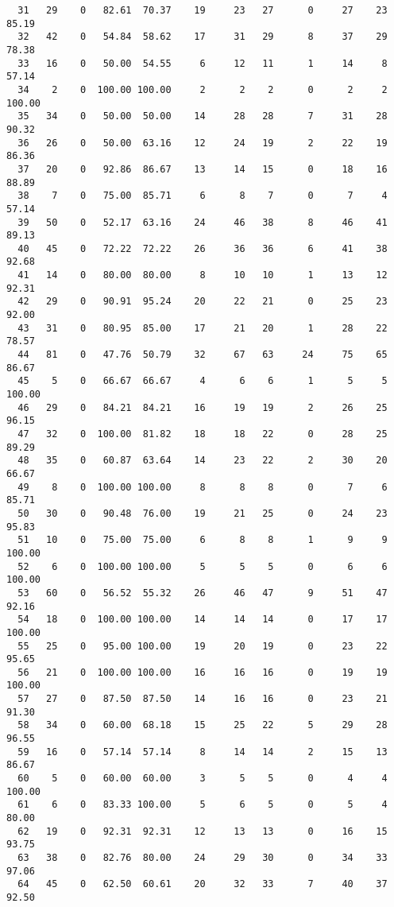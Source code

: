 \begin{verbatim}
  31   29    0   82.61  70.37    19     23   27      0     27    23    85.19
  32   42    0   54.84  58.62    17     31   29      8     37    29    78.38
  33   16    0   50.00  54.55     6     12   11      1     14     8    57.14
  34    2    0  100.00 100.00     2      2    2      0      2     2   100.00
  35   34    0   50.00  50.00    14     28   28      7     31    28    90.32
  36   26    0   50.00  63.16    12     24   19      2     22    19    86.36
  37   20    0   92.86  86.67    13     14   15      0     18    16    88.89
  38    7    0   75.00  85.71     6      8    7      0      7     4    57.14
  39   50    0   52.17  63.16    24     46   38      8     46    41    89.13
  40   45    0   72.22  72.22    26     36   36      6     41    38    92.68
  41   14    0   80.00  80.00     8     10   10      1     13    12    92.31
  42   29    0   90.91  95.24    20     22   21      0     25    23    92.00
  43   31    0   80.95  85.00    17     21   20      1     28    22    78.57
  44   81    0   47.76  50.79    32     67   63     24     75    65    86.67
  45    5    0   66.67  66.67     4      6    6      1      5     5   100.00
  46   29    0   84.21  84.21    16     19   19      2     26    25    96.15
  47   32    0  100.00  81.82    18     18   22      0     28    25    89.29
  48   35    0   60.87  63.64    14     23   22      2     30    20    66.67
  49    8    0  100.00 100.00     8      8    8      0      7     6    85.71
  50   30    0   90.48  76.00    19     21   25      0     24    23    95.83
  51   10    0   75.00  75.00     6      8    8      1      9     9   100.00
  52    6    0  100.00 100.00     5      5    5      0      6     6   100.00
  53   60    0   56.52  55.32    26     46   47      9     51    47    92.16
  54   18    0  100.00 100.00    14     14   14      0     17    17   100.00
  55   25    0   95.00 100.00    19     20   19      0     23    22    95.65
  56   21    0  100.00 100.00    16     16   16      0     19    19   100.00
  57   27    0   87.50  87.50    14     16   16      0     23    21    91.30
  58   34    0   60.00  68.18    15     25   22      5     29    28    96.55
  59   16    0   57.14  57.14     8     14   14      2     15    13    86.67
  60    5    0   60.00  60.00     3      5    5      0      4     4   100.00
  61    6    0   83.33 100.00     5      6    5      0      5     4    80.00
  62   19    0   92.31  92.31    12     13   13      0     16    15    93.75
  63   38    0   82.76  80.00    24     29   30      0     34    33    97.06
  64   45    0   62.50  60.61    20     32   33      7     40    37    92.50

\end{verbatim}
